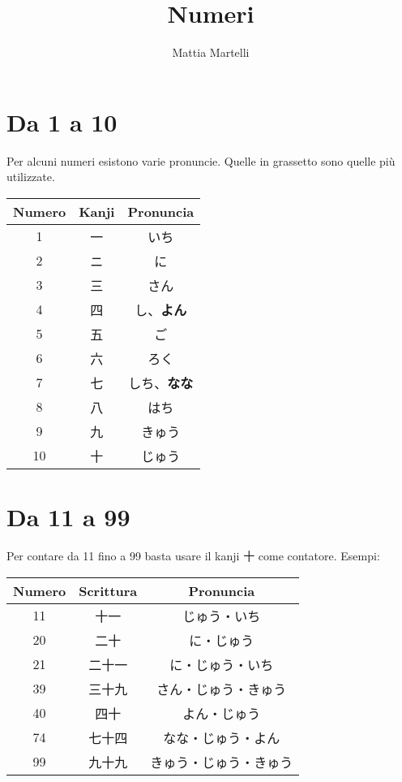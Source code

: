 \documentclass{article}
\title{Numeri}
\author{Mattia Martelli}
\date{}
\let\ita\textitalian
\newcommand{\itabf}[1]{\ita{\textbf{#1}}}
\newenvironment{tabJap}{\begin{center}\begin{japanese}\begin{longtable}{|c|c|c|}}{\end{longtable}\end{japanese}\end{center}}
\begin{document}
    \maketitle

    \tableofcontents

    \section{Da 1 a 10}

        Per alcuni numeri esistono varie pronuncie. Quelle in grassetto sono quelle più utilizzate.

        \begin{tabJap}
            \hline
            \itabf{Numero} & \itabf{Kanji} & \itabf{Pronuncia}\\
            \hline\hline
            1 & 一 & いち\\
            \hline
            2 & ニ & に\\
            \hline
            3 & 三 & さん\\
            \hline
            4 & 四 & し、\textbf{よん}\\
            \hline
            5 & 五 & ご\\
            \hline
            6 & 六 & ろく\\
            \hline
            7 & 七 & しち、\textbf{なな}\\
            \hline
            8 & 八 & はち\\
            \hline
            9 & 九 & きゅう\\
            \hline
            10 & 十 & じゅう\\
            \hline
        \end{tabJap}

    \newpage

    \section{Da 11 a 99}

        Per contare da 11 fino a 99 basta usare il kanji \textjapanese{十} come contatore.
        Esempi:

        \begin{tabJap}
            \hline
            \itabf{Numero} & \itabf{Scrittura} & \itabf{Pronuncia}\\
            \hline\hline
            11 & 十一 & じゅう・いち\\
            \hline
            20 & 二十 & に・じゅう\\
            \hline
            21 & 二十一 & に・じゅう・いち\\
            \hline
            39 & 三十九 & さん・じゅう・きゅう\\
            \hline
            40 & 四十 & よん・じゅう\\
            \hline
            74 & 七十四 & なな・じゅう・よん\\
            \hline
            99 & 九十九 & きゅう・じゅう・きゅう\\
            \hline
        \end{tabJap}
\end{document}
